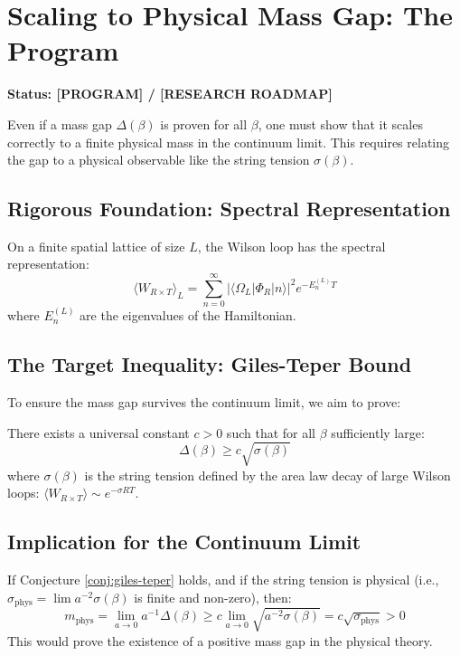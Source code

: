 \section{Scaling to Physical Mass Gap: The Program}
\label{sec:spectral-bound-program}

\textbf{Status: [PROGRAM] / [RESEARCH ROADMAP]}

Even if a mass gap $\Delta(\beta)$ is proven for all $\beta$, one must show that it scales correctly to a finite physical mass in the continuum limit. This requires relating the gap to a physical observable like the string tension $\sigma(\beta)$.

\subsection{Rigorous Foundation: Spectral Representation}

\begin{theorem}
\label{thm:spectral-wilson-rigorous}
On a finite spatial lattice of size $L$, the Wilson loop has the spectral representation:
\[
\langle W_{R \times T} \rangle_L = \sum_{n=0}^\infty |\langle \Omega_L | \Phi_R | n \rangle|^2 e^{-E_n^{(L)} T}
\]
where $E_n^{(L)}$ are the eigenvalues of the Hamiltonian.
\end{theorem}

\subsection{The Target Inequality: Giles-Teper Bound}

To ensure the mass gap survives the continuum limit, we aim to prove:

\begin{conjecture}
\label{conj:giles-teper}
There exists a universal constant $c > 0$ such that for all $\beta$ sufficiently large:
\[
\Delta(\beta) \ge c \sqrt{\sigma(\beta)}
\]
where $\sigma(\beta)$ is the string tension defined by the area law decay of large Wilson loops: $\langle W_{R \times T} \rangle \sim e^{-\sigma R T}$.
\end{conjecture}

\subsection{Implication for the Continuum Limit}

If Conjecture \ref{conj:giles-teper} holds, and if the string tension is physical (i.e., $\sigma_{\text{phys}} = \lim a^{-2} \sigma(\beta)$ is finite and non-zero), then:
\[
m_{\text{phys}} = \lim_{a \to 0} a^{-1} \Delta(\beta) \ge c \lim_{a \to 0} \sqrt{a^{-2} \sigma(\beta)} = c \sqrt{\sigma_{\text{phys}}} > 0
\]
This would prove the existence of a positive mass gap in the physical theory.


